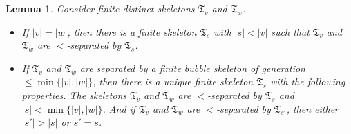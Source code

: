 \documentclass{amsart}
\newcommand{\1}{{\mathbb 1 }}
\newcommand{\skel}{{\mathfrak T}}
\newtheorem{lem}[thm]{Lemma}
\theoremstyle{remark}
\numberwithin{equation}{section}
\theoremstyle{definition}
\theoremstyle{nonumberbreak}
\begin{document}
\begin{lem}
\label{lem:bubble chains:sep comb}
Consider finite distinct skeletons $\skel_v$ and $\skel_w$. 
\begin{itemize}
\item If $|v|=|w|$, then there is a finite skeleton $\skel_s$ with $|s|<|v|$ such that $\skel_v$ and $\skel_w$ are $<$-separated by $\skel_s$.
\item If $\skel_v$ and $\skel_w$ are separated by a finite bubble skeleton of generation $\leq\min\{|v|,|w|\}$, then there is a unique finite skeleton $\skel_s$ with the following properties. The skeletons $\skel_v$ and $\skel_w$ are $<$-separated by $\skel_s$ and $|s|<\min\{|v|,|w|\}$. And if $\skel_v$ and $\skel_w$ are $<$-separated by $\skel_{s'}$, then either $|s'|>|s|$ or $s'=s$.
\end{itemize}
\end{lem}
\end{document}
